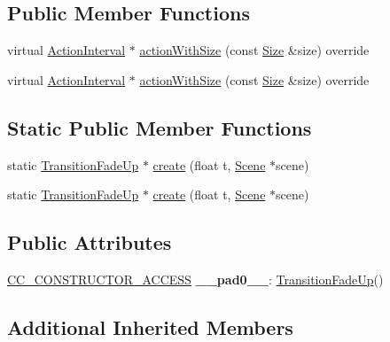 \subsection*{Public Member Functions}
\begin{DoxyCompactItemize}
\item 
virtual \hyperlink{classActionInterval}{Action\+Interval} $\ast$ \hyperlink{classTransitionFadeUp_a431d43ddd9acbf1854404a036063080e}{action\+With\+Size} (const \hyperlink{classSize}{Size} \&size) override
\item 
virtual \hyperlink{classActionInterval}{Action\+Interval} $\ast$ \hyperlink{classTransitionFadeUp_a3657902d0401d39788d7c15a2b8485e1}{action\+With\+Size} (const \hyperlink{classSize}{Size} \&size) override
\end{DoxyCompactItemize}
\subsection*{Static Public Member Functions}
\begin{DoxyCompactItemize}
\item 
static \hyperlink{classTransitionFadeUp}{Transition\+Fade\+Up} $\ast$ \hyperlink{classTransitionFadeUp_a63880a7f57ba3e8a88e9d0f4c1fae429}{create} (float t, \hyperlink{classScene}{Scene} $\ast$scene)
\item 
static \hyperlink{classTransitionFadeUp}{Transition\+Fade\+Up} $\ast$ \hyperlink{classTransitionFadeUp_a0a8ff113a716e182f74e3b170cdfe8c1}{create} (float t, \hyperlink{classScene}{Scene} $\ast$scene)
\end{DoxyCompactItemize}
\subsection*{Public Attributes}
\begin{DoxyCompactItemize}
\item 
\mbox{\label{classTransitionFadeUp_a3891b1a56030b02e9cb770324ec50cb0}} 
\hyperlink{_2cocos2d_2cocos_2base_2ccConfig_8h_a25ef1314f97c35a2ed3d029b0ead6da0}{C\+C\+\_\+\+C\+O\+N\+S\+T\+R\+U\+C\+T\+O\+R\+\_\+\+A\+C\+C\+E\+SS} {\bfseries \+\_\+\+\_\+pad0\+\_\+\+\_\+}\+: \hyperlink{classTransitionFadeUp}{Transition\+Fade\+Up}()
\end{DoxyCompactItemize}
\subsection*{Additional Inherited Members}


